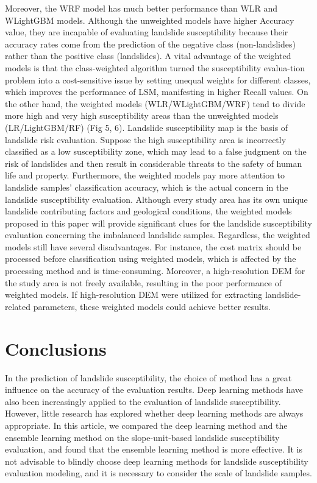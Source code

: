 \documentclass[a4paper,fleqn]{cas-sc}
\begin{document}
Moreover, the WRF model has much better performance than WLR and WLightGBM models. Although the unweighted models have higher Accuracy value, they are incapable of evaluating landslide susceptibility because their accuracy rates come from the prediction of the negative class (non-landslides) rather than the positive class (landslides). A vital advantage of the weighted models is that the class-weighted algorithm turned the susceptibility evalua-tion problem into a cost-sensitive issue by setting unequal weights for different classes, which improves the performance of LSM, manifesting in higher Recall values. On the other hand, the weighted models (WLR/WLightGBM/WRF) tend to divide more high and very high susceptibility areas than the unweighted models (LR/LightGBM/RF) (Fig 5, 6). Landslide susceptibility map is the basis of landslide risk evaluation. Suppose the high susceptibility area is incorrectly classified as a low susceptibility zone, which may lead to a false judgment on the risk of landslides and then result in considerable threats to the safety of human life and property. Furthermore, the weighted models pay more attention to landslide samples' classification accuracy, which is the actual concern in the landslide susceptibility evaluation. Although every study area has its own unique landslide contributing factors and geological conditions, the weighted models proposed in this paper will provide significant clues for the landslide susceptibility evaluation concerning the imbalanced landslide samples. Regardless, the weighted models still have several disadvantages. 
For instance, the cost matrix should be processed before classiﬁcation using weighted models, which is affected by the processing method and is time-consuming. Moreover, a high-resolution DEM for the study area is not freely available, resulting in the poor performance of weighted models. If high-resolution DEM were utilized for extracting landslide-related parameters, these weighted models could achieve better results. 

\section{Conclusions}

In the prediction of landslide susceptibility, the choice of method has a great influence on the accuracy of the evaluation results. 
Deep learning methods have also been increasingly applied to the evaluation of landslide susceptibility. 
However, little research has explored whether deep learning methods are always appropriate. 
In this article, we compared the deep learning method and the ensemble learning method on the slope-unit-based landslide susceptibility evaluation, and found that the ensemble learning method is more effective. 
It is not advisable to blindly choose deep learning methods for landslide susceptibility evaluation modeling, and it is necessary to consider the scale of landslide samples.
\end{document}
